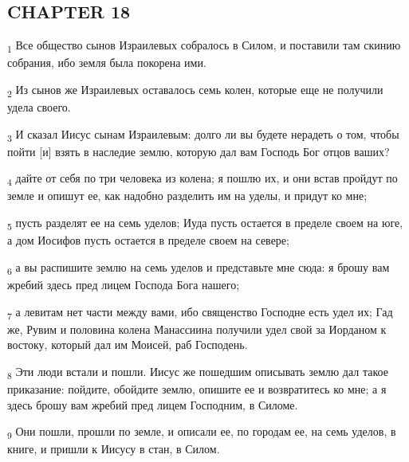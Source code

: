 \subsection{CHAPTER 18}
\begin{tcolorbox}
\textsubscript{1} Все общество сынов Израилевых собралось в Силом, и поставили там скинию собрания, ибо земля была покорена ими.
\end{tcolorbox}
\begin{tcolorbox}
\textsubscript{2} Из сынов же Израилевых оставалось семь колен, которые еще не получили удела своего.
\end{tcolorbox}
\begin{tcolorbox}
\textsubscript{3} И сказал Иисус сынам Израилевым: долго ли вы будете нерадеть о том, чтобы пойти [и] взять в наследие землю, которую дал вам Господь Бог отцов ваших?
\end{tcolorbox}
\begin{tcolorbox}
\textsubscript{4} дайте от себя по три человека из колена; я пошлю их, и они встав пройдут по земле и опишут ее, как надобно разделить им на уделы, и придут ко мне;
\end{tcolorbox}
\begin{tcolorbox}
\textsubscript{5} пусть разделят ее на семь уделов; Иуда пусть остается в пределе своем на юге, а дом Иосифов пусть остается в пределе своем на севере;
\end{tcolorbox}
\begin{tcolorbox}
\textsubscript{6} а вы распишите землю на семь уделов и представьте мне сюда: я брошу вам жребий здесь пред лицем Господа Бога нашего;
\end{tcolorbox}
\begin{tcolorbox}
\textsubscript{7} а левитам нет части между вами, ибо священство Господне есть удел их; Гад же, Рувим и половина колена Манассиина получили удел свой за Иорданом к востоку, который дал им Моисей, раб Господень.
\end{tcolorbox}
\begin{tcolorbox}
\textsubscript{8} Эти люди встали и пошли. Иисус же пошедшим описывать землю дал такое приказание: пойдите, обойдите землю, опишите ее и возвратитесь ко мне; а я здесь брошу вам жребий пред лицем Господним, в Силоме.
\end{tcolorbox}
\begin{tcolorbox}
\textsubscript{9} Они пошли, прошли по земле, и описали ее, по городам ее, на семь уделов, в книге, и пришли к Иисусу в стан, в Силом.
\end{tcolorbox}
